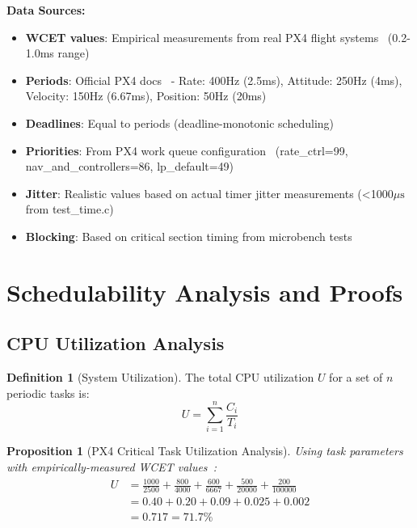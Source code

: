 \documentclass[11pt,a4paper]{article}
\newcommand{\mus}{\ensuremath{\mu\text{s}}}
\newtheorem{proposition}[theorem]{Proposition}
\theoremstyle{definition}
\newtheorem{definition}[theorem]{Definition}
\theoremstyle{remark}
\begin{document}
\textbf{Data Sources:}
\begin{itemize}
\item \textbf{WCET values}: Empirical measurements from real PX4 flight systems~\cite{px4_wcet_measurements,px4_microbench} (0.2-1.0ms range)
\item \textbf{Periods}: Official PX4 docs~\cite{px4} - Rate: 400Hz (2.5ms), Attitude: 250Hz (4ms), Velocity: 150Hz (6.67ms), Position: 50Hz (20ms)
\item \textbf{Deadlines}: Equal to periods (deadline-monotonic scheduling)
\item \textbf{Priorities}: From PX4 work queue configuration~\cite{px4} (rate\_ctrl=99, nav\_and\_controllers=86, lp\_default=49)
\item \textbf{Jitter}: Realistic values based on actual timer jitter measurements (<1000\mus from test\_time.c)~\cite{px4_perf}
\item \textbf{Blocking}: Based on critical section timing from microbench tests~\cite{px4_microbench}
\end{itemize}

\section{Schedulability Analysis and Proofs}

\subsection{CPU Utilization Analysis}

\begin{definition}[System Utilization]
The total CPU utilization $U$ for a set of $n$ periodic tasks is:
\begin{equation}
U = \sum_{i=1}^{n} \frac{C_i}{T_i}
\end{equation}
\end{definition}

\begin{proposition}[PX4 Critical Task Utilization Analysis]
Using task parameters with empirically-measured WCET values~\cite{px4_wcet_measurements}:
\begin{align}
U &= \frac{1000}{2500} + \frac{800}{4000} + \frac{600}{6667} + \frac{500}{20000} + \frac{200}{100000} \\
&= 0.40 + 0.20 + 0.09 + 0.025 + 0.002 \\
&= 0.717 = 71.7\%
\end{align}
\end{proposition}
\end{document}

